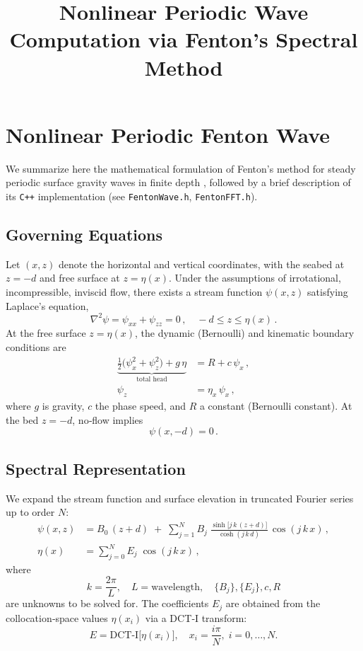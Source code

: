 \documentclass{article}
\title{Nonlinear Periodic Wave Computation via Fenton’s Spectral Method}
\author{}
\date{}
\begin{document}
\maketitle

\section{Nonlinear Periodic Fenton Wave}
\label{sec:fenton_method}

\noindent
We summarize here the mathematical formulation of Fenton’s method for steady periodic surface gravity waves in finite depth \cite{Fenton1988}, followed by a brief description of its \verb|C++| implementation (see \texttt{FentonWave.h}, \texttt{FentonFFT.h}).

\subsection{Governing Equations}

Let $(x,z)$ denote the horizontal and vertical coordinates, with the seabed at $z=-d$ and free surface at $z=\eta(x)$. Under the assumptions of irrotational, incompressible, inviscid flow, there exists a stream function $\psi(x,z)$ satisfying Laplace’s equation,
\begin{equation}
\nabla^2 \psi = \psi_{xx} + \psi_{zz} = 0\,, \quad -d \le z \le \eta(x)\,.
\end{equation}
At the free surface $z=\eta(x)$, the dynamic (Bernoulli) and kinematic boundary conditions are
\begin{align}
\underbrace{\tfrac12\bigl(\psi_x^2 + \psi_z^2\bigr) + g\,\eta}_{\text{total head}}
  &= R + c\,\psi_x\,, 
  \label{eq:bernoulli}\\
\psi_z &= \eta_x\,\psi_x\,,
  \label{eq:kinematic}
\end{align}
where $g$ is gravity, $c$ the phase speed, and $R$ a constant (Bernoulli constant). At the bed $z=-d$, no‐flow implies
\begin{equation}
\psi(x,-d)=0\,.
\end{equation}

\subsection{Spectral Representation}

We expand the stream function and surface elevation in truncated Fourier series up to order $N$:
\begin{align}
\psi(x,z) &= B_0\,(z + d)
   \;+\;\sum_{j=1}^{N} B_j\;\frac{\sinh\!\bigl[j\,k\,(z + d)\bigr]}{\cosh(j\,k\,d)}
   \,\cos(j\,k\,x)\,,
   \label{eq:psi_series}\\
\eta(x) &= \sum_{j=0}^{N} E_j\;\cos(j\,k\,x)\,,
   \label{eq:eta_series}
\end{align}
where
\[
k = \frac{2\pi}{L}, 
\quad L = \text{wavelength}, 
\quad \{B_j\},\{E_j\},c,R
\]
are unknowns to be solved for. The coefficients $E_j$ are obtained from the collocation‐space values $\eta(x_i)$ via a DCT‐I transform:
\[
E = \mathrm{DCT\text{-}I}\bigl[\eta(x_i)\bigr], 
\quad x_i = \frac{i\pi}{N},\; i=0,\dots,N.
\]
\end{document}
